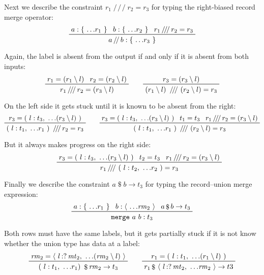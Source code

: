 \documentclass[11pt, twoside, reqno]{book}
\providecommand{\lcurvyangle}{\langle}
\providecommand{\rcurvyangle}{\rangle}
\begin{document}
Next we describe the constraint \(r_1 \mathop{/\!/\!/} r_2 = r_3\) for typing the right-biased record merge operator:
\begin{displaymath}
\prftree{a : \{\ \dots\!r_1\ \}}{b : \{\ \dots\!r_2\ \}}{r_1 \mathop{/\!/\!/} r_2 = r_3}{a \mathop{/\!/} b : \{\ \dots\!r_3\ \}}
\end{displaymath}

Again, the label is absent from the output if and only if it is absent from both inputs:
\begin{displaymath}
\prftree{r_1 = (r_1 \setminus l)}{r_2 = (r_2 \setminus l)}{r_1 \mathop{/\!/\!/} r_2 = (r_3 \setminus l)}
\qquad
\prftree{r_3 = (r_3 \setminus l)}{(r_1 \setminus l)\ \mathop{/\!/\!/}\ (r_2 \setminus l) = r_3}
\end{displaymath}

On the left side it gets stuck until it is known to be absent from the right:
\begin{displaymath}
\prftree
  {r_3 = (\ l : t_3,\ \dots\!(r_3 \setminus l)\ )}
  {(\ l : t_1,\ \dots\!r_1\ )\ \mathop{/\!/\!/} r_2 = r_3}
\qquad
\prftree
  {r_3 = (\ l : t_3,\ \dots\!(r_3 \setminus l)\ )}
  {t_1 = t_3}
  {r_1 \mathop{/\!/\!/} r_2 = (r_3 \setminus l)}
  {(\ l : t_1,\ \dots\!r_1\ )\ \mathop{/\!/\!/}\ (r_2 \setminus l) = r_3}
\end{displaymath}

But it always makes progress on the right side:
\begin{displaymath}
\qquad
\prftree
  {r_3 = (\ l : t_3,\ \dots\!(r_3 \setminus l)\ )}
  {t_2 = t_3}
  {r_1 \mathop{/\!/\!/} r_2 = (r_3 \setminus l)}
  {r_1 \mathop{/\!/\!/}\ (\ l : t_2,\ \dots\!r_2\ ) = r_3}
\end{displaymath}

Finally we describe the constraint \(a \mathop{\$} b \to t_3\) for typing the record--union merge expression:
\begin{displaymath}
\prftree{a : \{\ \dots\!r_1\ \}}{b : \langle\ \dots\!\mathit{rm}_2\ \rangle}{a \mathop{\$} b \to t_3}{\texttt{merge}\ a\ b : t_3}
\end{displaymath}

Both rows must have the same labels, but it gets partially stuck if it is not know whether the union type has data at a label:
\begin{displaymath}
\prftree{\mathit{rm}_2 = \lcurvyangle\ l \mathop{{:}{?}} \mathit{mt}_2,\ \dots\!(\mathit{rm}_2 \setminus l)\ \rcurvyangle}{(\ l : t_1,\ \dots\!r_1 )\ \mathop{\$} \mathit{rm}_2 \to t_3}
\qquad
\prftree{r_1 = (\ l : t_1,\ \dots\!(r_1 \setminus l)\ )}{r_1 \mathop{\$}\ \lcurvyangle\ l \mathop{{:}{?}} \mathit{mt}_2,\ \dots\!\mathit{rm}_2\ \rcurvyangle \to t3}
\end{displaymath}
\end{document}
